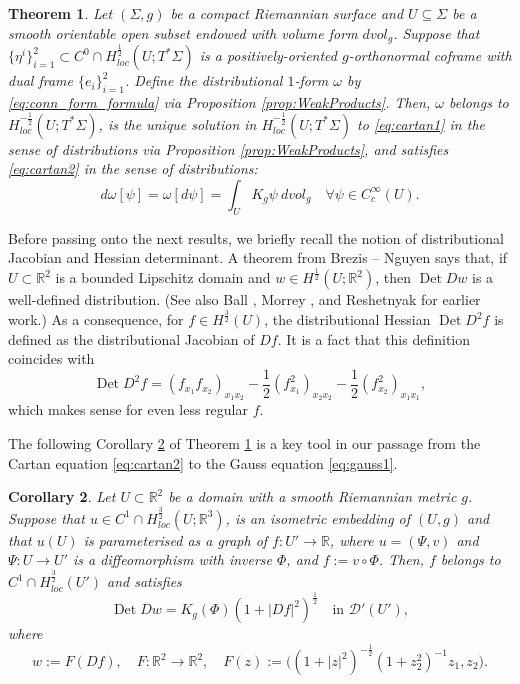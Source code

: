 \documentclass[12pt]{article}
\newcommand{\R}{\mathbb{R}}
\newcommand{\Det}{\operatorname{Det}}
\theoremstyle{plain}
\newtheorem{theorem}{Theorem}[section]
\newtheorem{corollary}[theorem]{Corollary}
\numberwithin{equation}{section}
\begin{document}
\begin{theorem} \label{thm:cartan_main}
    Let $(\Sigma,g)$ be a compact Riemannian surface and $U \subseteq \Sigma$ be a smooth orientable open subset endowed with volume form $dvol_g$. Suppose that $\{\eta^i\}_{i=1}^2 \subset C^0\cap H^\frac12_{loc}(U;T^*\Sigma)$ is a positively-oriented $g$-orthonormal coframe with dual frame $\{e_i\}_{i=1}^2$. Define the distributional $1$-form $\omega$ by \eqref{eq:conn_form_formula} via Proposition \ref{prop:WeakProducts}. Then, $\omega$ belongs to $H^{-\frac12}_{loc}(U; T^*\Sigma)$, is the unique solution in $H^{-\frac12}_{loc}(U;T^*\Sigma)$ to \eqref{eq:cartan1} in the sense of distributions via Proposition \ref{prop:WeakProducts}, and satisfies \eqref{eq:cartan2} in the sense of distributions:
    \begin{equation*}
        d\omega [\psi] = \omega[d\psi] = \int_{U} K_g \psi ~dvol_g \quad \forall \psi \in C^\infty_c(U).
    \end{equation*}
\end{theorem}

Before passing onto the next results, we briefly recall the notion of distributional Jacobian and Hessian determinant. A theorem from Brezis -- Nguyen \cite{brezis_nguyen_11} says that, if $U \subset \R^2$ is a bounded Lipschitz domain and $w \in H^\frac12(U;\R^2)$, then $\Det Dw$ is a well-defined distribution. (See also Ball \cite{ball_77}, Morrey \cite{morrey}, and Reshetnyak \cite{reshetnyak67} for earlier work.) As a consequence, for $f \in H^\frac32(U)$, the distributional Hessian $\Det D^2f$ is defined as the distributional Jacobian of $Df$. It is a fact that this definition coincides with
\begin{equation*}
    \Det D^2 f = (f_{x_1}f_{x_2})_{x_1 x_2} - \frac12 (f_{x_1}^2)_{x_2 x_2} - \frac12 (f_{x_2}^2)_{x_1 x_1},
\end{equation*}
which makes sense for even less regular $f$.

The following Corollary \ref{cor:cartan_particular_frame} of Theorem \ref{thm:cartan_main} is a key tool in our passage from the Cartan equation \eqref{eq:cartan2} to the Gauss equation \eqref{eq:gauss1}.
\begin{corollary} \label{cor:cartan_particular_frame}
    Let $U \subset \R^2$ be a domain with a smooth Riemannian metric $g$. Suppose that $u \in C^1 \cap H^{\frac32}_{loc}(U;\R^3)$, is an isometric embedding of $(U,g)$ and that $u(U)$ is parameterised as a graph of $f: U' \to \R$, where $u = (\Psi,v)$ and $\Psi: U \to U'$ is a diffeomorphism with inverse $\Phi$, and $f := v \circ \Phi$. Then, $f$ belongs to $C^1 \cap H^{\frac32}_{loc}(U')$ and satisfies
    \begin{equation} \label{eq:jacobian_intermediate}
        \Det Dw= K_g(\Phi)(1+|Df|^2)^\frac12 \quad \text{in } \mathcal{D}'(U'),
    \end{equation}
    where
    \begin{equation*}
        w := F(Df), \quad F : \R^2 \to \R^2, \quad F(z):= \big((1+|z|^2)^{-\frac12}(1+z_2^2)^{-1} z_1, z_2\big).
    \end{equation*}
\end{corollary}
\end{document}
